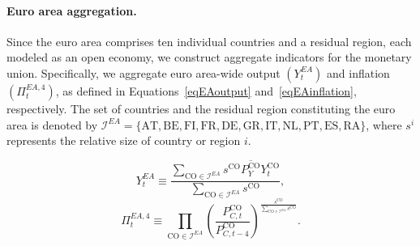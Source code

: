 \documentclass[a4paper,11pt]{article}
\numberwithin{equation}{section}
\begin{document}
\paragraph{Euro area aggregation.} Since the euro area comprises ten individual countries and a residual region, each modeled as an open economy, we construct aggregate indicators for the monetary union. Specifically, we aggregate euro area-wide output $(Y_t^{EA})$ and inflation $(\Pi_t^{EA,4})$, as defined in Equations~\ref{eqEAoutput} and~\ref{eqEAinflation}, respectively. The set of countries and the residual region constituting the euro area is denoted by \(\mathcal{I}^{EA} = \{ \text{AT}, \text{BE}, \text{FI}, \text{FR}, \text{DE}, \text{GR}, \text{IT}, \text{NL}, \text{PT}, \text{ES}, \text{RA} \}\), where \(s^i\) represents the relative size of country or region \(i\).

\begin{equation} \label{eqEAoutput}
    Y_t^{EA} \equiv \frac{\sum\limits_{\mathrm{CO} \in \mathcal{I}^{EA}} s^\mathrm{CO} \overline{P_Y^{\mathrm{CO}}} Y_t^\mathrm{CO}}{\sum\limits_{\mathrm{CO} \in \mathcal{I}^{EA}} s^\mathrm{CO}},
\end{equation}
\begin{equation} \label{eqEAinflation}
    \Pi_t^{EA,4} \equiv \prod\limits_{\mathrm{CO} \in \mathcal{I}^{EA}} \left( \frac{P_{C,t}^\mathrm{CO}}{P_{C,t-4}^\mathrm{CO}} \right)^{\frac{s^\mathrm{CO}}{\sum\limits_{\mathrm{CO} \in \mathcal{I}^{EA}} s^\mathrm{CO}}}.
\end{equation}
\end{document}
